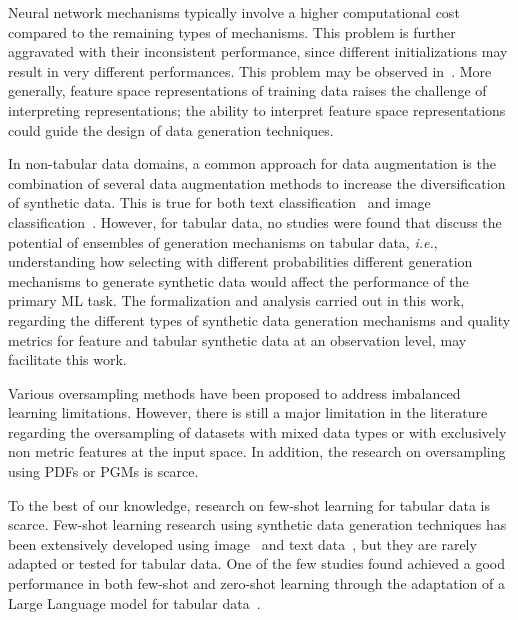 \documentclass[parskip=full]{scrartcl}
\begin{document}
Neural network mechanisms typically involve a higher computational cost
compared to the remaining types of mechanisms. This problem is further
aggravated with their inconsistent performance, since different
initializations may result in very different performances. This problem may be
observed in~\cite{douzas2018effective}. More generally, feature space
representations of training data raises the challenge of interpreting
representations; the ability to interpret feature space representations could
guide the design of data generation techniques. 

In non-tabular data domains, a common approach for data augmentation is the
combination of several data augmentation methods to increase the
diversification of synthetic data. This is true for both text
classification~\cite{bayer2021survey} and image
classification~\cite{grill2020bootstrap}. However, for tabular data, no
studies were found that discuss the potential of ensembles of generation
mechanisms on tabular data, \textit{i.e.}, understanding how selecting with
different probabilities different generation mechanisms to generate synthetic
data would affect the performance of the primary ML task. The formalization
and analysis carried out in this work, regarding the different types of
synthetic data generation mechanisms and quality metrics for feature and
tabular synthetic data at an observation level, may facilitate this work.


Various oversampling methods have been proposed to address imbalanced learning
limitations. However, there is still a major limitation in the literature
regarding the oversampling of datasets with mixed data types or with
exclusively non metric features at the input space. In addition, 
the research on oversampling using PDFs or PGMs is scarce.

To the best of our knowledge, research on few-shot learning for tabular data
is scarce. Few-shot learning research using synthetic data generation
techniques has been extensively developed using
image~\cite{cubuk2019autoaugment, zhao2019data} and text
data~\cite{zhou2021flipda}, but they are rarely adapted or tested for tabular
data. One of the few studies found achieved a good performance in both
few-shot and zero-shot learning through the adaptation of a Large Language
model for tabular data~\cite{hegselmann2022tabllm}. 

\end{document}
